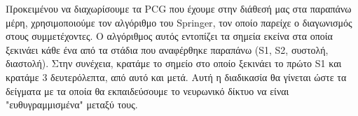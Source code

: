 \documentclass[../main.tex]{subfiles}
\begin{document}
Προκειμένου να διαχωρίσουμε τα PCG που έχουμε στην διάθεσή μας στα παραπάνω
μέρη, χρησιμοποιούμε τον αλγόριθμο του Springer\cite{springer2015logistic}, τον
οποίο  παρείχε ο διαγωνισμός στους συμμετέχοντες. Ο αλγόριθμος αυτός εντοπίζει
τα σημεία εκείνα στα οποία ξεκινάει κάθε ένα από τα στάδια που αναφέρθηκε
παραπάνω (S1, S2, συστολή, διαστολή). Στην συνέχεια, κρατάμε το σημείο στο οποίο
ξεκινάει το πρώτο S1 και κρατάμε 3 δευτερόλεπτα, από αυτό και μετά. Αυτή η
διαδικασία θα γίνεται ώστε τα δείγματα με τα οποία θα εκπαιδεύσουμε το νευρωνικό
δίκτυο να είναι "ευθυγραμμισμένα" μεταξύ τους.
\end{document}
